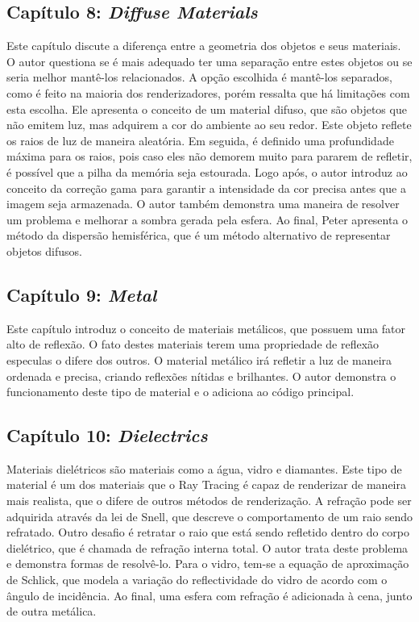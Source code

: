 \documentclass[journal]{IEEEtran}
\begin{document}
\subsection*{Capítulo 8: \emph{Diffuse Materials}}
Este capítulo discute a diferença entre a geometria dos objetos e seus materiais. O autor questiona se é
mais adequado ter uma separação entre estes objetos ou se seria melhor mantê-los relacionados. A opção
escolhida é mantê-los separados, como é feito na maioria dos renderizadores, porém ressalta que há 
limitações com esta escolha. Ele apresenta o conceito de um material difuso, que são objetos que não
emitem luz, mas adquirem a cor do ambiente ao seu redor. Este objeto reflete os raios de luz de maneira
aleatória. Em seguida, é definido uma profundidade máxima para os raios, pois caso eles não demorem
muito para pararem de refletir, é possível que a pilha da memória seja estourada. Logo após, o autor 
introduz ao conceito da correção gama para garantir a intensidade da cor precisa antes que a imagem seja
armazenada. O autor também demonstra uma maneira de resolver um problema e melhorar a sombra gerada pela
esfera. Ao final, Peter apresenta o método da dispersão hemisférica, que é um método alternativo de 
representar objetos difusos.

\subsection*{Capítulo 9: \emph{Metal}}
Este capítulo introduz o conceito de materiais metálicos, que possuem uma fator alto de reflexão. O fato
destes materiais terem uma propriedade de reflexão especulas o difere dos outros. O material metálico
irá refletir a luz de maneira ordenada e precisa, criando reflexões nítidas e brilhantes. O autor demonstra
o funcionamento deste tipo de material e o adiciona ao código principal.

\subsection*{Capítulo 10: \emph{Dielectrics}}
Materiais dielétricos são materiais como a água, vidro e diamantes. Este tipo de material é um dos materiais
que o Ray Tracing é capaz de renderizar de maneira mais realista, que o difere de outros métodos de renderização.
A refração pode ser adquirida através da lei de Snell, que descreve o comportamento de um raio sendo refratado.
Outro desafio é retratar o raio que está sendo refletido dentro do corpo dielétrico, que é chamada de refração
interna total. O autor trata deste problema e demonstra formas de resolvê-lo. Para o vidro, tem-se a equação
de aproximação de Schlick, que modela a variação do reflectividade do vidro de acordo com o ângulo de incidência.
Ao final, uma esfera com refração é adicionada à cena, junto de outra metálica.
\end{document}
